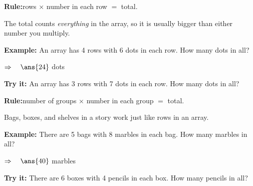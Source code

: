\documentclass[12pt]{article}
\begin{document}


\begin{formulabox}
\textbf{Rule:}\quad rows $\times$ number in each row $=$ total.\par
The total counts \emph{everything} in the array, so it is usually bigger than either number you multiply.
\end{formulabox}

\begin{examplebox}
\textbf{Example:} An array has 4 rows with 6 dots in each row. How many dots in all?

$\Rightarrow\quad\ans{24}$ dots
\end{examplebox}

\begin{tryitbox}
\textbf{Try it:} An array has 3 rows with 7 dots in each row. How many dots in all?\\[2pt]
\end{tryitbox}


\begin{formulabox}
\textbf{Rule:}\quad number of groups $\times$ number in each group $=$ total.\par
Bags, boxes, and shelves in a story work just like rows in an array.
\end{formulabox}

\begin{examplebox}
\textbf{Example:} There are 5 bags with 8 marbles in each bag. How many marbles in all?

$\Rightarrow\quad\ans{40}$ marbles
\end{examplebox}

\begin{tryitbox}
\textbf{Try it:} There are 6 boxes with 4 pencils in each box. How many pencils in all?\\[2pt]
\end{tryitbox}
\end{document}

